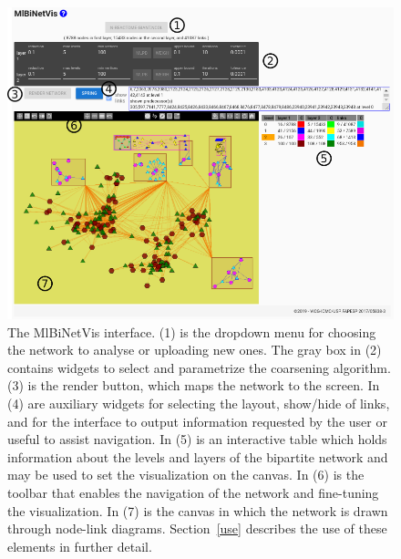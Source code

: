 \documentclass[runningheads]{llncs}
\begin{document}
\begin{figure}\centering
 \includegraphics[width=\textwidth]{overall____}
  \caption{The MlBiNetVis interface. (1) is the dropdown menu for choosing the network to analyse or uploading new ones.
  The gray box in (2) contains widgets to select and parametrize the coarsening algorithm.
  (3) is the render button, which maps the network to the screen.
  In (4) are auxiliary widgets for selecting the  layout, show/hide of links, and for the interface to output information requested by the user or useful to assist navigation.
  In (5) is an interactive table which holds information about the levels and layers of the bipartite network and may be used to set the visualization on the canvas.
  In (6) is the toolbar that enables the navigation of the network and fine-tuning the visualization.
  In (7) is the canvas in which the network is drawn through node-link diagrams.
  Section~\ref{use} describes the use of these elements in further detail.
  }\label{fpage0}
\end{figure}
\end{document}
